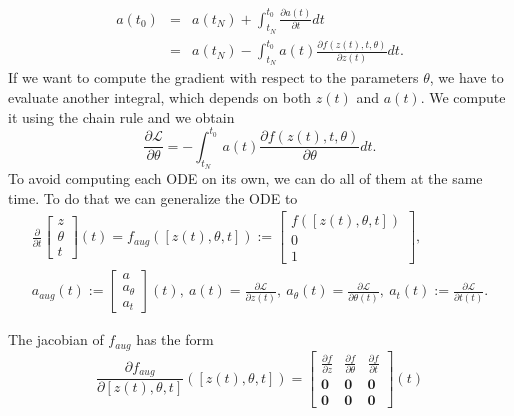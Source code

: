\documentclass[10pt,a4paper]{article}
\theoremstyle{definition}
\theoremstyle{plain}
\begin{document}
\begin{eqnarray*}
a(t_0) &=& a(t_N) + \int^{t_0}_{t_N} \frac{\partial a(t)}{\partial t} dt\\
	   &=& a(t_N) - \int^{t_0}_{t_N} a(t) \frac{\partial f(z(t),t,\theta)} {\partial z(t)} dt.
\end{eqnarray*}
If we want to compute the gradient with respect to the parameters $\theta$, we have to evaluate another integral, which depends on both $z(t)$ and $a(t)$. We compute it using the chain rule and we obtain
\begin{equation}
\label{devtheta}
\frac{\partial \mathcal{L}}{\partial \theta} = - \int^{t_0}_{t_N} a(t) \frac{\partial f(z(t),t,\theta)} {\partial \theta} dt.
\end{equation}
To avoid computing each ODE on its own, we can do all of them at the same time. To do that we can generalize the ODE to
\begin{eqnarray*}
\frac{\partial}{\partial t} \begin{bmatrix}
							z \\ \theta \\ t
							\end{bmatrix} (t) 
= f_{aug}([z(t),\theta ,t]) := \begin{bmatrix}
							f([z(t),\theta ,t]) \\ 0 \\ 1
							\end{bmatrix}, \\
a_{aug} (t) := \begin{bmatrix}
			a \\ a_{\theta} \\ a_t
			\end{bmatrix} (t) , \ 
a(t) = \frac{\partial \mathcal{L}}{\partial z(t)}, \ 
a_\theta (t) = \frac{\partial \mathcal{L}}{\partial \theta (t)}, \ 
a_t(t) := \frac{\partial \mathcal{L}}{\partial t(t)}.
\end{eqnarray*}

The jacobian of $f_{aug}$ has the form
\begin{equation*}
\frac{\partial f_{aug}}{\partial [z(t),\theta,t]}([z(t),\theta,t]) = \begin{bmatrix}
\frac{\partial f}{\partial z} & \frac{\partial f}{\partial \theta} & \frac{\partial f}{\partial t} \\
\textbf{0} & \textbf{0} & \textbf{0} \\
\textbf{0} & \textbf{0} & \textbf{0}
\end{bmatrix}(t)
\end{equation*}
\end{document}

